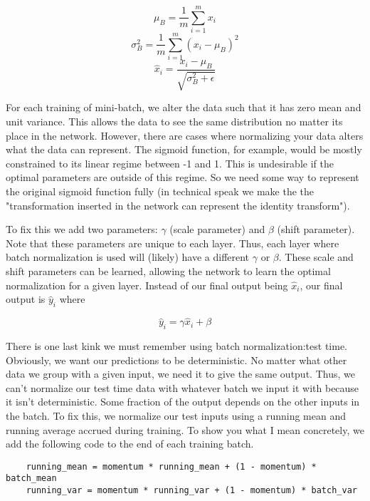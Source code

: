 \documentclass[12pt]{article}
\begin{document}
\begin{equation*}
    \mu_B = \frac{1}{m} \sum_{i=1}^m x_i
\end{equation*}
\begin{equation*}
    \sigma_B^2 = \frac{1}{m} \sum_{i=1}^m (x_i - \mu_B)^2
\end{equation*}
\begin{equation*}
    \hat{x}_i = \frac{x_i - \mu_B}{\sqrt{\sigma_B^2 + \epsilon}}
\end{equation*}


For each training of mini-batch, we alter the data such that it has zero mean and unit variance. 
This allows the data to see the same distribution no matter its place in the network. However, 
there are cases where normalizing your data alters what the data can represent. The sigmoid function, 
for example, would be mostly constrained to its linear regime between -1 and 1. This is undesirable if 
the optimal parameters are outside of this regime. So we need some way to represent the original 
sigmoid function fully (in technical speak we make the the "transformation inserted in the network can 
represent the identity transform"). 

To fix this we add two parameters: $\gamma$ (scale parameter) and $\beta$ (shift parameter). Note 
that these parameters are unique to each layer. Thus, each layer where batch normalization is 
used will (likely) have a different $\gamma$ or $\beta$. These scale and shift parameters can be 
learned, allowing the network to learn the optimal normalization for a given layer. Instead of our 
final output being $\hat{x}_i$, our final output is $\hat{y}_i$ where  

\begin{equation*}
    \hat{y}_i = \gamma \hat{x}_i + \beta
\end{equation*}

There is one last kink we must remember using batch normalization:test time. Obviously, we 
want our predictions to be deterministic. No matter what other data we group with a given input, 
we need it to give the same output. Thus, we can't normalize our test time data with 
whatever batch we input it with because it isn't deterministic. Some fraction of the output depends 
on the other inputs in the batch. To fix this, we normalize our test inputs using a running mean and 
running average accrued during training. To show you what I mean concretely, 
we add the following code to the end of each training batch. 

\begin{verbatim}
    running_mean = momentum * running_mean + (1 - momentum) * batch_mean
    running_var = momentum * running_var + (1 - momentum) * batch_var
\end{verbatim}
\end{document}
